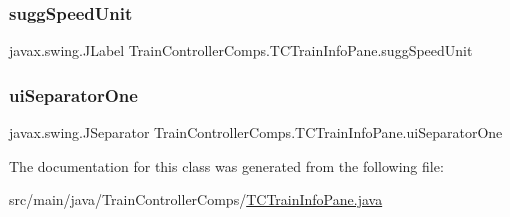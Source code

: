 \subsubsection{\texorpdfstring{sugg\+Speed\+Unit}{suggSpeedUnit}}
{\footnotesize\ttfamily javax.\+swing.\+J\+Label Train\+Controller\+Comps.\+T\+C\+Train\+Info\+Pane.\+sugg\+Speed\+Unit\hspace{0.3cm}{\ttfamily [private]}}

\mbox{\label{classTrainControllerComps_1_1TCTrainInfoPane_a97285213bfc29bdda84e53054b83ed7b}} 
\subsubsection{\texorpdfstring{ui\+Separator\+One}{uiSeparatorOne}}
{\footnotesize\ttfamily javax.\+swing.\+J\+Separator Train\+Controller\+Comps.\+T\+C\+Train\+Info\+Pane.\+ui\+Separator\+One\hspace{0.3cm}{\ttfamily [private]}}



The documentation for this class was generated from the following file\+:\begin{DoxyCompactItemize}
\item 
src/main/java/\+Train\+Controller\+Comps/\hyperlink{TCTrainInfoPane_8java}{T\+C\+Train\+Info\+Pane.\+java}\end{DoxyCompactItemize}

